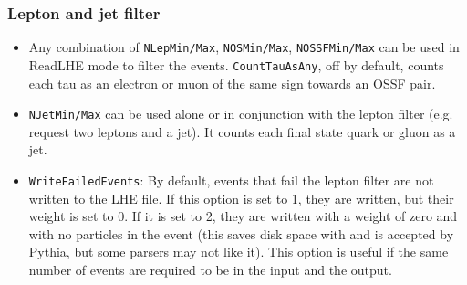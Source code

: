 \documentclass[aps,superscriptaddress,nofootinbib]{revtex4}
\begin{document}
\subsubsection{Lepton and jet filter}
\begin{itemize}
\item Any combination of \verb|NLepMin/Max|, \verb|NOSMin/Max|, \verb|NOSSFMin/Max| can be used in ReadLHE mode to filter the events.  \verb|CountTauAsAny|, off by default, counts each tau as an electron or muon of the same sign towards an OSSF pair.
\item \verb|NJetMin/Max| can be used alone or in conjunction with the lepton filter (e.g. request two leptons and a jet).  It counts each final state quark or gluon as a jet.
\item \verb|WriteFailedEvents|: By default, events that fail the lepton filter are not written to the LHE file.  If this option is set to 1, they are written, but their weight is set to 0.  If it is set to 2, they are written with a weight of zero and with no particles in the event (this saves disk space with  and is accepted by Pythia, but some parsers may not like it).  This option is useful if the same number of events are required to be in the input and the output.
\end{itemize}
\end{document}
